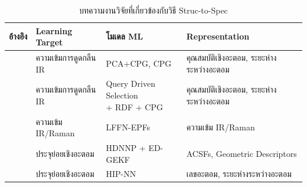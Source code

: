 \begin{table}[H]
    \centering
    \caption{บทความงานวิจัยที่เกี่ยวข้องกับวิธี Struc-to-Spec}
    \label{tab:struc2spec}
    \small
    \begin{tabular}{clll}
    \toprule
    \textbf{อ้างอิง} &\textbf{Learning Target} &\textbf{โมเดล ML} &\textbf{Representation} \\
    \midrule
    \autocite{schuur1996,Schuur1997} & ความเข้มการดูดกลืน IR & PCA+CPG\autocite{hecht-nielsen1987}, 
    CPG\autocite{hecht-nielsen1987} & คุณสมบัติเชิงอะตอม, ระยะห่างระหว่างอะตอม \\
    
    \autocite{selzer2000,kostka2001} & ความเข้มการดูดกลืน IR & \makecell[tl]{Query Driven Selection \\ + RDF + 
    CPG\autocite{hecht-nielsen1987}} & คุณสมบัติเชิงอะตอม, ระยะห่างระหว่างอะตอม \\
    
    \autocite{yildiz2011,yildiz2012} & ความเข้ม IR/Raman & LFFN-EPFs\autocite{yildiz2011} & ความเข้ม IR/Raman \\
    
    \autocite{gastegger2017} & ประจุย่อยเชิงอะตอม & HDNNP\autocite{behler2007} + ED-GEKF\autocite{gastegger2015} 
    & ACSFs\autocite{behler2011a}, Geometric Descriptors \\
    
    \autocite{sifain2018,nebgen2018} & ประจุย่อยเชิงอะตอม & HIP-NN\autocite{lubbers2018} & เลขอะตอม, 
    ระยะห่างระหว่างอะตอม \\
   \bottomrule
\end{tabular}
\end{table}

